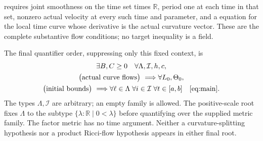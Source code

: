 \documentclass[11pt]{article}
\theoremstyle{remark}\newtheorem{remark}[theorem]{Remark}
\newcommand{\R}{\mathbb R}
\begin{document}
 requires joint
 smoothness on the time set times $\R$, period one at each
time in that set, nonzero actual velocity at every such time and parameter,
and a  equation for the local time curve whose derivative
is the actual curvature vector. These are the complete substantive flow
conditions; no target inequality is a field.

The final quantifier order, suppressing only this fixed context, is
\[
 \begin{gathered}
 \exists B,C\ge0\quad\forall\Lambda,\mathcal I,h,c,\\
 \bigl(\text{actual curve flows}\bigr)\ \Longrightarrow
 \forall L_0,\Theta_0,\\
 \bigl(\text{initial bounds}\bigr)\ \Longrightarrow
 \forall\ell\in\Lambda\;\forall i\in\mathcal I\;\forall t\in[a,b]\quad\eqref{eq:main}.
 \end{gathered}
\]
The types $\Lambda,\mathcal I$ are arbitrary; an empty family is allowed.
The positive-scale root fixes $\Lambda$ to the subtype
$\{\lambda:\R\mid0<\lambda\}$ before quantifying over the supplied metric
family. The factor metric has no time argument. Neither a curvature-splitting
hypothesis nor a product Ricci-flow hypothesis appears in either final root.



\end{document}
